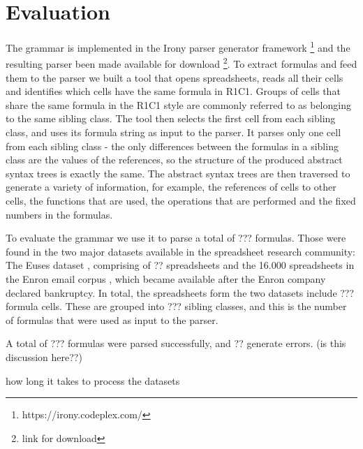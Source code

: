 \documentclass[conference]{IEEEtran}
\begin{document}
\section{Evaluation}
The grammar is implemented in the Irony parser generator framework \footnote{https://irony.codeplex.com/} and the resulting parser been made available for download \footnote{link for download}. To extract formulas and feed them to the parser we built a tool that opens spreadsheets, reads all their cells and identifies which cells have the same formula in R1C1. Groups of cells that share the same formula in the R1C1 style are commonly referred to as belonging to the same sibling class. The tool then selects the first cell from each sibling class, and uses its formula string as input to the parser. It parses only one cell from each sibling class - the only differences between the formulas in a sibling class are the values of the references, so the structure of the produced abstract syntax trees is exactly the same. The abstract syntax trees are then traversed to generate a variety of information, for example, the references of cells to other cells, the functions that are used, the operations that are performed and the fixed numbers in the formulas.

To evaluate the grammar we use it to parse a total of ??? formulas. Those were found in the two major datasets available in the spreadsheet research community: The Euses dataset \cite{euses}, comprising of ?? spreadsheets and the 16.000 spreadsheets in the Enron email corpus \cite{enron}, which became available after the Enron company declared bankruptcy. In total, the spreadsheets form the two datasets include ??? formula cells. These are grouped into ??? sibling classes, and this is the number of formulas that were used as input to the parser.

A total of ??? formulas were parsed successfully, and ?? generate errors. (is this discussion here??)

how long it takes to process the datasets
\end{document}
